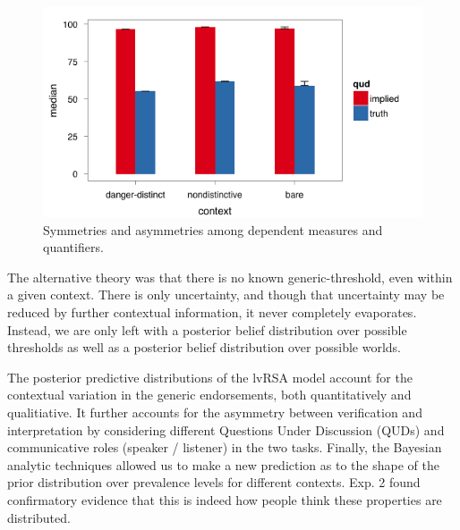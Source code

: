 \documentclass[10pt,letterpaper]{article}
\begin{document}
\begin{figure}
\centering
    \includegraphics[width=\columnwidth]{asymmetry_byContext_condTwice}
    \caption{Symmetries and asymmetries among dependent measures and quantifiers.}
  \label{fig:asymmetry}
\end{figure}

The alternative theory was that there is no known generic-threshold, even within a given context. There is only uncertainty, and though that uncertainty may be reduced by further contextual information, it never completely evaporates. Instead, we are only left with a posterior belief distribution over possible thresholds as well as a posterior belief distribution over possible worlds. 

The posterior predictive distributions of the lvRSA model account for the contextual variation in the generic endorsements, both quantitatively and qualitiative. It further accounts for the asymmetry between verification and interpretation by considering different Questions Under Discussion (QUDs) and communicative roles (speaker / listener) in the two tasks. Finally, the Bayesian analytic techniques allowed us to make a new prediction as to the shape of the prior distribution over prevalence levels for different contexts. Exp. 2 found confirmatory evidence that this is indeed how people think these properties are distributed.

%
 
\end{document}
